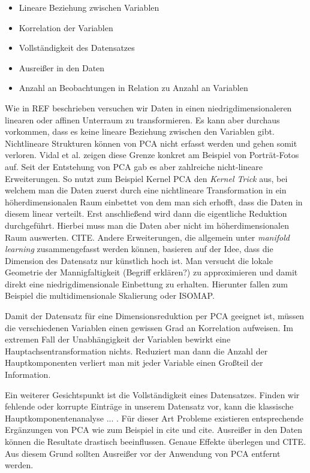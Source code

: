 \begin{itemize}
\item Lineare Beziehung zwischen Variablen
\item Korrelation der Variablen
\item Vollständigkeit des Datensatzes
\item Ausreißer in den Daten
\item Anzahl an Beobachtungen in Relation zu Anzahl an Variablen
\end{itemize}

Wie in REF beschrieben versuchen wir Daten in einen niedrigdimensionaleren linearen oder affinen Unterraum zu transformieren. Es kann aber durchaus vorkommen, dass es keine lineare Beziehung zwischen den Variablen gibt. Nichtlineare Strukturen können von PCA nicht erfasst werden und gehen somit verloren. \cite{vidal} Vidal et al. zeigen diese Grenze konkret am Beispiel von Porträt-Fotos auf. Seit der Entstehung von PCA gab es aber zahlreiche nicht-lineare Erweiterungen. So nutzt zum Beispiel Kernel PCA den \textit{Kernel Trick} aus, bei welchem man die Daten zuerst durch eine nichtlineare Transformation in ein höherdimensionalen Raum einbettet von dem man sich erhofft, dass die Daten in diesem linear verteilt. Erst anschließend wird dann die eigentliche Reduktion durchgeführt. Hierbei muss man die Daten aber nicht im höherdimensionalen Raum auswerten. CITE. Andere Erweiterungen, die allgemein unter \textit{manifold learning} zusammengefasst werden können, basieren auf der Idee, dass die Dimension des Datensatz nur künstlich hoch ist. Man versucht die lokale Geometrie der Mannigfaltigkeit (Begriff erklären?) zu approximieren und damit direkt eine niedrigdimensionale Einbettung zu erhalten. Hierunter fallen zum Beispiel die multidimensionale Skalierung oder ISOMAP.

Damit der Datensatz für eine Dimensionsreduktion per PCA geeignet ist, müssen die verschiedenen Variablen einen gewissen Grad an Korrelation aufweisen. Im extremen Fall der Unabhängigkeit der Variablen bewirkt eine Hauptachsentransformation nichts. Reduziert man dann die Anzahl der Hauptkomponenten verliert man mit jeder Variable einen Großteil der Information.

Ein weiterer Gesichtspunkt ist die Vollständigkeit eines Datensatzes. Finden wir fehlende oder korrupte Einträge in unserem Datensatz vor, kann die klassische Hauptkomponentenanalyse ... . Für dieser Art Probleme existieren entsprechende Ergänzungen von PCA wie zum Beispiel in cite und cite. Ausreißer in den Daten können die Resultate drastisch beeinflussen. Genaue Effekte überlegen und CITE. Aus diesem Grund sollten Ausreißer vor der Anwendung von PCA entfernt werden.

